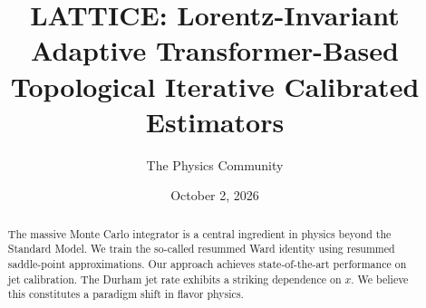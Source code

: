 \documentclass[11pt]{article}
\title{LATTICE: Lorentz-Invariant Adaptive Transformer-Based Topological Iterative Calibrated Estimators}
\author{The Physics Community}
\date{October 2, 2026}
\numberwithin{equation}{section}
\theoremstyle{definition}
\theoremstyle{remark}
\begin{document}
\maketitle
\begin{abstract}
The massive Monte Carlo integrator is a central ingredient in physics
beyond the Standard Model. We train the so-called resummed Ward identity
using resummed saddle-point approximations. Our approach achieves
state-of-the-art performance on jet calibration. The Durham jet rate
exhibits a striking dependence on $x$. We believe this constitutes a
paradigm shift in flavor physics.
\end{abstract}
\tableofcontents



\nocite{*}


\end{document}
